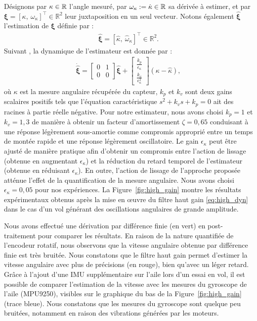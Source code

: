 Désignons par $\kappa \in {\mathbb R}$ l'angle mesuré, par $\omega_{\kappa} := \dot \kappa  \in {\mathbb R}$ sa dérivée à estimer, et par $\boldsymbol{\xi} = [\kappa,~\omega_{\kappa}]^\top \in \mathbb{R}^2$ leur juxtaposition en un seul vecteur. Notons également $\hat{\boldsymbol{\xi}}$ l'estimation de $\boldsymbol{\xi}$ définie par :
\begin{align*}
    \hat{\boldsymbol{\xi}} = [\hat{\kappa},~\hat{\omega}_{\kappa}]^\top \in \mathbb{R}^2.
\end{align*}
Suivant \cite{203613}, la dynamique de l'estimateur est donnée par :
\begin{align}
\label{eq:high_dyn}
    \dot{\hat{\boldsymbol{\xi}}} =  \begin{bmatrix}0 & 1 \\ 0 & 0 \end{bmatrix} \hat{\boldsymbol{\xi}}+ \begin{bmatrix}\frac{k_{p}}{\epsilon_{\kappa}}  \\ \frac{k_{v}}{\epsilon_{\kappa}^{2}}  \end{bmatrix} (\kappa - \hat{\kappa}),
\end{align}
où $\kappa$ est la mesure angulaire récupérée du capteur, $k_{p}$ et $k_{v}$ sont deux gains scalaires positifs tels que l'équation caractéristique $s^{2} + k_{v} s + k_{p} = 0$ ait des racines à partie réelle négative. Pour notre estimateur, nous avons choisi $k_{p} = 1$ et $k_{v} = 1,3$ de manière à obtenir un facteur d'amortissement $\zeta = 0,65$ conduisant à une réponse légèrement sous-amortie comme compromis approprié entre un temps de montée rapide et une réponse légèrement oscillatoire. Le gain $\epsilon_{\kappa}$ peut être ajusté de manière pratique afin d'obtenir un compromis entre l'action de lissage (obtenue en augmentant $\epsilon_{\kappa}$) et la réduction du retard temporel
de l'estimateur (obtenue en réduisant $\epsilon_{\kappa}$). En outre, l'action de lissage de l'approche proposée atténue l'effet de la quantification de la mesure angulaire. Nous avons choisi $\epsilon_{\kappa} = 0,05$ pour nos expériences. La Figure~\ref{fig:high_gain} montre les résultats expérimentaux obtenus après la mise en œuvre du filtre haut gain \eqref{eq:high_dyn} dans le cas d'un vol générant des oscillations angulaires de grande amplitude.

Nous avons effectué une dérivation par différence finie (en vert) en post-traitement pour comparer les résultats. En raison de la nature quantifiée de l'encodeur rotatif, nous observons que la vitesse angulaire obtenue par différence finie est très bruitée. Nous constatons que le filtre haut gain permet d'estimer la vitesse angulaire avec plus de précisions (en rouge), bien qu'avec un léger retard. Grâce à l'ajout d'une IMU supplémentaire sur l'aile lors d'un essai en vol, il est possible de comparer l'estimation de la vitesse avec les mesures du gyroscope de l'aile (MPU9250), visibles sur le graphique du bas de la Figure~\ref{fig:high_gain} (trace bleue). Nous constatons que les mesures du gyroscope sont quelque peu bruitées, notamment en raison des vibrations générées par les moteurs. 

